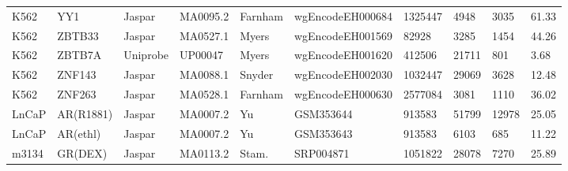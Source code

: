 {\begin{longtable}{p{1.1cm}p{1.0cm}p{1.0cm}p{1.0cm}p{1.0cm}p{2.3cm}p{1.0cm}p{0.8cm}p{0.8cm}p{0.8cm}}
K562 & YY1 & Jaspar & MA0095.2 & Farnham & wgEncodeEH000684 & 1325447 & 4948 & 3035 & 61.33\\
K562 & ZBTB33 & Jaspar & MA0527.1 & Myers & wgEncodeEH001569 & 82928 & 3285 & 1454 & 44.26\\
K562 & ZBTB7A & Uniprobe & UP00047 & Myers & wgEncodeEH001620 & 412506 & 21711 & 801 & 3.68\\
K562 & ZNF143 & Jaspar & MA0088.1 & Snyder & wgEncodeEH002030 & 1032447 & 29069 & 3628 & 12.48\\
K562 & ZNF263 & Jaspar & MA0528.1 & Farnham & wgEncodeEH000630 & 2577084 & 3081 & 1110 & 36.02\\
LnCaP & AR(R1881) & Jaspar & MA0007.2 & Yu & GSM353644 & 913583 & 51799 & 12978 & 25.05\\
LnCaP & AR(ethl) & Jaspar & MA0007.2 & Yu & GSM353643 & 913583 & 6103 & 685 & 11.22\\
m3134 & GR(DEX) & Jaspar & MA0113.2 & Stam. & SRP004871 & 1051822 & 28078 & 7270 & 25.89\\
        \hline
\end{longtable}
}


\clearpage


